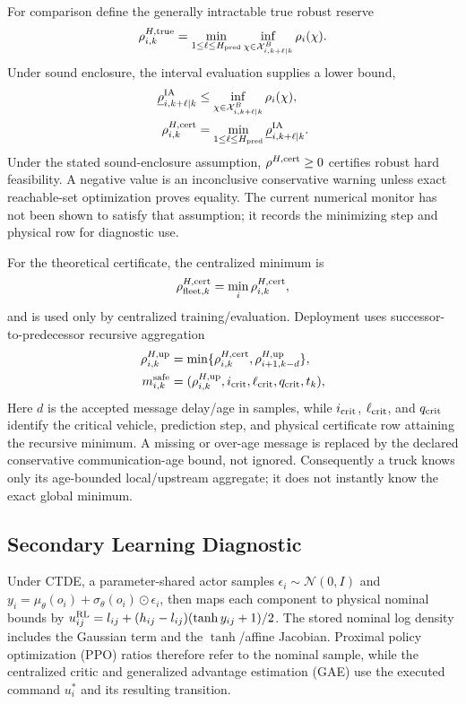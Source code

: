 For comparison define the generally intractable true robust reserve
\begin{equation}
\rho_{i,k}^{H,{\rm true}}=\min_{1\le\ell\le H_{\rm pred}}\inf_{\chi\in\mathcal X^B_{i,k+\ell\mid k}}\rho_i(\chi).
\end{equation}
Under sound enclosure, the interval evaluation supplies a lower bound,
\begin{align}
\underline\rho^{\rm IA}_{i,k+\ell\mid k}
&\le\inf_{\chi\in\mathcal X^B_{i,k+\ell\mid k}}\rho_i(\chi),\label{eq:predlower}\\
\rho_{i,k}^{H,{\rm cert}}
&=\min_{1\le\ell\le H_{\rm pred}}\underline\rho^{\rm IA}_{i,k+\ell\mid k}.\label{eq:rhocert}
\end{align}
Under the stated sound-enclosure assumption, $\rho^{H,{\rm cert}}\ge0$ certifies robust hard feasibility. A negative value is an inconclusive conservative warning unless exact reachable-set optimization proves equality. The current numerical monitor has not been shown to satisfy that assumption; it records the minimizing step and physical row for diagnostic use.

For the theoretical certificate, the centralized minimum is
\begin{equation}\label{eq:fleetreserve}
\rho_{{\rm fleet},k}^{H,{\rm cert}}=\min_i\rho_{i,k}^{H,{\rm cert}},
\end{equation}
and is used only by centralized training/evaluation. Deployment uses successor-to-predecessor recursive aggregation
\begin{align}
\rho_{i,k}^{H,{\rm up}}&=\min\{\rho_{i,k}^{H,{\rm cert}},\rho_{i+1,k-d}^{H,{\rm up}}\},\label{eq:minconsensus}\\
m_{i,k}^{\rm safe}&=(\rho_{i,k}^{H,{\rm up}},i_{\rm crit},\ell_{\rm crit},q_{\rm crit},t_k),
\end{align}
Here $d$ is the accepted message delay/age in samples, while $i_{\rm crit}$, $\ell_{\rm crit}$, and $q_{\rm crit}$ identify the critical vehicle, prediction step, and physical certificate row attaining the recursive minimum. A missing or over-age message is replaced by the declared conservative communication-age bound, not ignored. Consequently a truck knows only its age-bounded local/upstream aggregate; it does not instantly know the exact global minimum.





\subsection{Secondary Learning Diagnostic}
Under CTDE, a parameter-shared actor samples $\epsilon_i\sim\mathcal N(0,I)$ and $y_i=\mu_\theta(o_i)+\sigma_\theta(o_i)\odot\epsilon_i$, then maps each component to physical nominal bounds by $u_{ij}^{\rm RL}=l_{ij}+(h_{ij}-l_{ij})(\tanh y_{ij}+1)/2$. The stored nominal log density includes the Gaussian term and the $\tanh$/affine Jacobian. Proximal policy optimization (PPO) ratios therefore refer to the nominal sample, while the centralized critic and generalized advantage estimation (GAE) use the executed command $u_i^*$ and its resulting transition.

